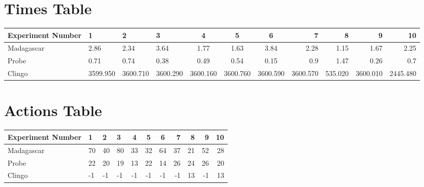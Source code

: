\documentclass[8pt]{article}
\begin{document}
\begin{landscape}
\section{Times Table}\begin{tabular}{ | l | l | l | l | c | c | c | r | r | r | r | }\hline
Experiment Number & 1 & 2 & 3 & 4 & 5 & 6 & 7 & 8 & 9 & 10\\  \hline
Madagascar & 2.86 & 2.34 & 3.64 & 1.77 & 1.63 & 3.84 & 2.28 & 1.15 & 1.67 & 2.25\\  \hline
Probe & 0.71 & 0.74 & 0.38 & 0.49 & 0.54 & 0.15 & 0.9 & 1.47 & 0.26 & 0.7\\  \hline
Clingo & 3599.950 & 3600.710 & 3600.290 & 3600.160 & 3600.760 & 3600.590 & 3600.570 & 535.020 & 3600.010 & 2445.480\\  \hline
\end{tabular}
\section{Actions Table}\begin{tabular}{ | l | l | l | l | c | c | c | r | r | r | r | }\hline
Experiment Number & 1 & 2 & 3 & 4 & 5 & 6 & 7 & 8 & 9 & 10\\ \hline
 Madagascar & 70 & 40 & 80 & 33 & 32 & 64 & 37 & 21 & 52 & 28\\ \hline
 Probe & 22 & 20 & 19 & 13 & 22 & 14 & 26 & 24 & 26 & 20\\ \hline
 Clingo & -1 & -1 & -1 & -1 & -1 & -1 & -1 & 13 & -1 & 13\\ \hline
\end{tabular}
\end{landscape}
\end{document}
